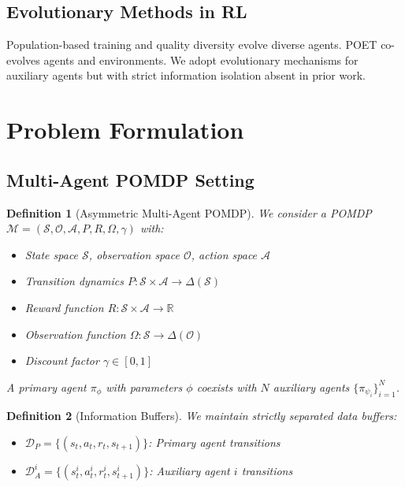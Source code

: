 \documentclass[12pt, a4paper]{article}
\newtheorem{definition}{Definition}
\begin{document}
\subsection{Evolutionary Methods in RL}
Population-based training \cite{jaderberg2017population} and quality diversity \cite{pugh2016quality} evolve diverse agents. POET \cite{wang2019paired} co-evolves agents and environments. We adopt evolutionary mechanisms for auxiliary agents but with strict information isolation absent in prior work.

\section{Problem Formulation}

\subsection{Multi-Agent POMDP Setting}

\begin{definition}[Asymmetric Multi-Agent POMDP]
We consider a POMDP \\$\mathcal{M} = (\mathcal{S}, \mathcal{O}, \mathcal{A}, P, R, \Omega, \gamma)$ with:
\begin{itemize}
\item State space $\mathcal{S}$, observation space $\mathcal{O}$, action space $\mathcal{A}$
\item Transition dynamics $P: \mathcal{S} \times \mathcal{A} \rightarrow \Delta(\mathcal{S})$
\item Reward function $R: \mathcal{S} \times \mathcal{A} \rightarrow \mathbb{R}$
\item Observation function $\Omega: \mathcal{S} \rightarrow \Delta(\mathcal{O})$
\item Discount factor $\gamma \in [0,1]$
\end{itemize}
A primary agent $\pi_\phi$ with parameters $\phi$ coexists with $N$ auxiliary agents $\{\pi_{\psi_i}\}_{i=1}^N$.
\end{definition}

\begin{definition}[Information Buffers]
We maintain strictly separated data buffers:
\begin{itemize}
\item $\mathcal{D}_P = \{(s_t, a_t, r_t, s_{t+1})\}$: Primary agent transitions
\item $\mathcal{D}_A^i = \{(s_t^i, a_t^i, r_t^i, s_{t+1}^i)\}$: Auxiliary agent $i$ transitions
\end{itemize}
\end{definition}
\end{document}
